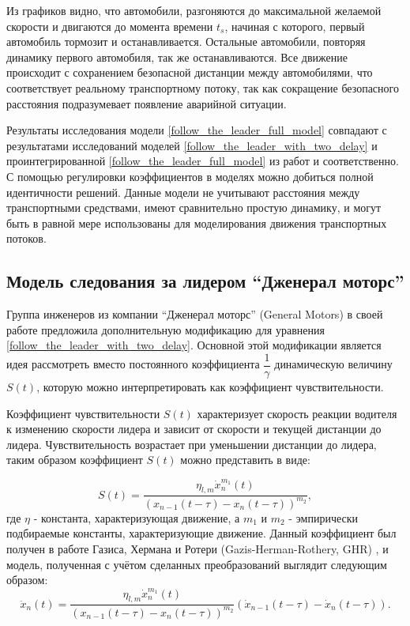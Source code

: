\documentclass[12pt, a4paper]{extarticle}
\numberwithin{equation}{section}
\numberwithin{figure}{section}
\begin{document}
Из графиков видно, что автомобили, разгоняются до максимальной желаемой скорости и двигаются до момента времени $t_s$, начиная с которого, первый автомобиль тормозит и останавливается. Остальные автомобили, повторяя динамику первого автомобиля, так же останавливаются. Все движение происходит с сохранением безопасной дистанции между автомобилями, что соответствует реальному транспортному потоку, так как сокращение безопасного расстояния подразумевает появление аварийной ситуации.

Результаты исследования модели \eqref{follow_the_leader_full_model} совпадают с  результатами исследований моделей \eqref{follow_the_leader_with_two_delay} и проинтегрированной \eqref{follow_the_leader_full_model} из работ \cite{RefineFirstFollowTheLeaderModel} и \cite{Course} соответственно. С помощью регулировки коэффициентов в моделях можно добиться полной идентичности решений. Данные модели не учитывают расстояния между транспортными средствами, имеют сравнительно простую динамику, и могут быть в равной мере использованы для моделирования движения транспортных потоков. 

\subsection{Модель следования за лидером ``Дженерал моторс''}

Группа инженеров из компании ``Дженерал моторс'' (General Motors) в своей работе \cite{GazisModel} предложила дополнительную модификацию для уравнения  \eqref{follow_the_leader_with_two_delay}. Основной этой модификации является идея рассмотреть вместо постоянного коэффициента $\dfrac{1}{\gamma}$ динамическую величину $S(t)$, которую можно интерпретировать как коэффициент чувствительности. 

Коэффициент чувствительности $S(t)$ характеризует скорость реакции водителя к изменению скорости лидера и зависит от скорости и текущей дистанции до лидера. Чувствительность возрастает при уменьшении дистанции до лидера, таким образом коэффициент $S(t)$ можно представить в виде:

\begin{equation} \label{gazis_coefficient}
S(t) = \dfrac{\eta_{l,m}\dot{x}_n^{m_1}(t)}{(x_{n-1}(t-\tau)-x_n(t-\tau))^{m_2}},
\end{equation}
где $\eta$ - константа, характеризующая движение, а $m_1$ и $m_2$ - эмпирически подбираемые константы, характеризующие движение. Данный коэффициент был получен в работе Газиса, Хермана и Ротери (Gazis-Herman-Rothery, GHR)  \cite{GazisModel}, и модель, полученная с учётом сделанных преобразований выглядит следующим образом:   
\begin{equation} \label{gazis_model}
\ddot{x}_n(t) = \dfrac{\eta_{l,m}\dot{x}_n^{m_1}(t)}{(x_{n-1}(t-\tau)-x_n(t-\tau))^{m_2}} (\dot{x}_{n-1}(t-\tau) - \dot{x}_{n}(t-\tau)).
\end{equation}
\end{document}
